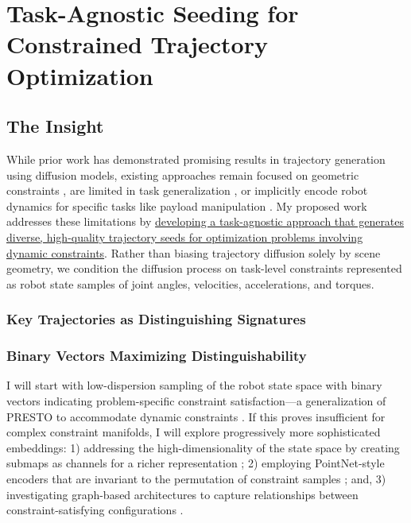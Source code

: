 
\chapter{Task-Agnostic Seeding for Constrained Trajectory Optimization}
\label{ch:seeding}



\section{The Insight}
\label{sec:seeding:insight}

While prior work has demonstrated promising results in trajectory generation using diffusion models, existing approaches remain focused on geometric constraints \cite{sundaralingam2023curobo,seo2024presto}, are limited in task generalization \cite{ichnowski2020deep}, or implicitly encode robot dynamics for specific tasks like payload manipulation \cite{pasricha2025payload}.
My proposed work addresses these limitations by \ul{developing a task-agnostic approach that generates diverse, high-quality trajectory seeds for optimization problems involving dynamic constraints}.
Rather than biasing trajectory diffusion solely by scene geometry, we condition the diffusion process on task-level constraints represented as robot state samples of joint angles, velocities, accelerations, and torques.

\subsection{Key Trajectories as Distinguishing Signatures}
\label{sec:seeding:keytrajectories}


\subsection{Binary Vectors Maximizing Distinguishability}
\label{sec:seeding:binary}

I will start with low-dispersion sampling of the robot state space with binary vectors indicating problem-specific constraint satisfaction---a generalization of PRESTO to accommodate dynamic constraints \cite{seo2024presto}. If this proves insufficient for complex constraint manifolds, I will explore progressively more sophisticated embeddings: 1) addressing the high-dimensionality of the state space by creating submaps as channels for a richer representation \cite{krizhevsky2012imagenet}; 2) employing PointNet-style encoders that are invariant to the permutation of constraint samples \cite{qi2017pointnet}; and, 3) investigating graph-based architectures to capture relationships between constraint-satisfying configurations \cite{hamilton2017inductive}.

